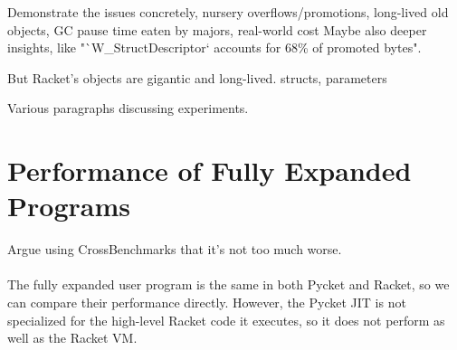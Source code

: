 		\begin{show-experiment}
				Demonstrate the issues concretely, nursery overflows/promotions, long-lived old objects, GC pause time eaten by majors, real-world cost
				Maybe also deeper insights, like "`W\_StructDescriptor` accounts for 68\% of promoted bytes".
		\end{show-experiment}

		\begin{paragraph-here}
			But Racket's objects are gigantic and long-lived.	structs, parameters
		\end{paragraph-here}

		\begin{paragraph-here}
			Various paragraphs discussing experiments.
		\end{paragraph-here}

	\section{Performance of Fully Expanded Programs}
	\label{section:cross-benchmarks}

		\begin{mainpoint}
				Argue using CrossBenchmarks that it's not too much worse.
		\end{mainpoint}

		\paragraph{}%
		The fully expanded user program is the same in both Pycket and Racket, so we can compare their performance directly.  However, the Pycket JIT is not specialized for the high-level Racket code it executes, so it does not perform as well as the Racket VM.






